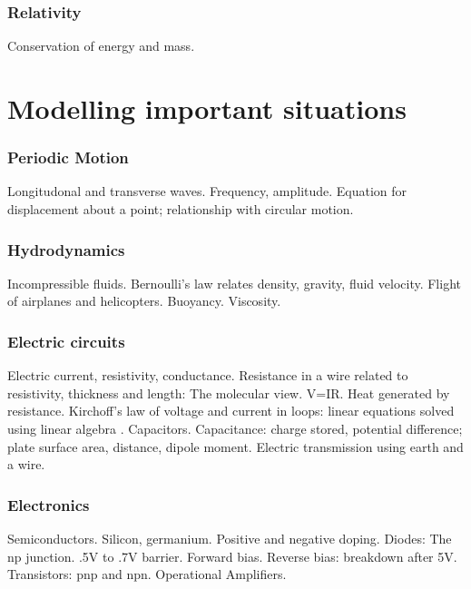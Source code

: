 \documentclass{article}
\begin{document}
\section{Relativity}
Conservation of energy and mass.

\part{Modelling important situations}
\section{Periodic Motion}
Longitudonal and transverse waves. Frequency, amplitude. Equation for displacement about a point; relationship with circular motion.

\section{Hydrodynamics}
Incompressible fluids. Bernoulli's law relates density, gravity, fluid velocity. Flight of airplanes and helicopters. Buoyancy. Viscosity.

\section{Electric circuits}
Electric current, resistivity, conductance. Resistance in a wire related to resistivity, thickness and length: The molecular view. V=IR. Heat generated by resistance. Kirchoff's law of voltage and current in loops: linear equations solved using linear algebra \cite{strang}. Capacitors. Capacitance: charge stored, potential difference; plate surface area, distance, dipole moment. Electric transmission using earth and a wire.

\section{Electronics}
Semiconductors. Silicon, germanium. Positive and negative doping. Diodes: The np junction. .5V to .7V barrier. Forward bias. Reverse bias: breakdown after 5V. Transistors: pnp and npn. Operational Amplifiers.



\end{document}
